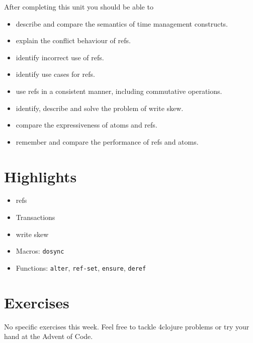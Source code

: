\documentclass[11pt,a4paper]{article}
\begin{document}
After completing this unit you should be able to

\begin{itemize}
	\item describe and compare the semantics of time management constructs.
    \item explain the conflict behaviour of refs.
    \item identify incorrect use of refs.
    \item identify use cases for refs.
    \item use refs in a consistent manner, including commutative operations.
    \item identify, describe and solve the problem of write skew.
    \item compare the expressiveness of atoms and refs.
    \item remember and compare the performance of refs and atoms.
\end{itemize}

\section{Highlights}

\begin{itemize}
    \item refs 
    \item Transactions
    \item write skew
    \item Macros: \verb|dosync|
    \item Functions: \verb|alter|, \verb|ref-set|, \verb|ensure|, \verb|deref|
\end{itemize}



\section{Exercises}

No specific exercises this week. Feel free to tackle 4clojure problems or try your hand at the Advent of Code.
\end{document}
